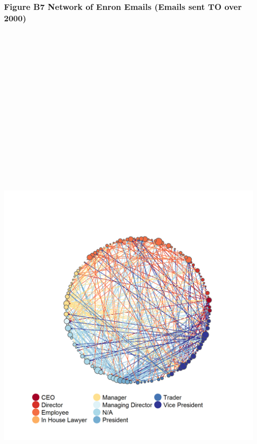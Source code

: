 \documentclass[]{article}
\begin{document}
\newpage

\subsubsection{Figure B7 Network of Enron Emails (Emails sent TO over
2000)}\label{figure-b7-network-of-enron-emails-emails-sent-to-over-2000}

\section{\texorpdfstring{\protect\includegraphics[height=12.50000in]{images/n_to_00e.png}}{Network of Enron Emails}}\label{network-of-enron-emails-4}
\end{document}
